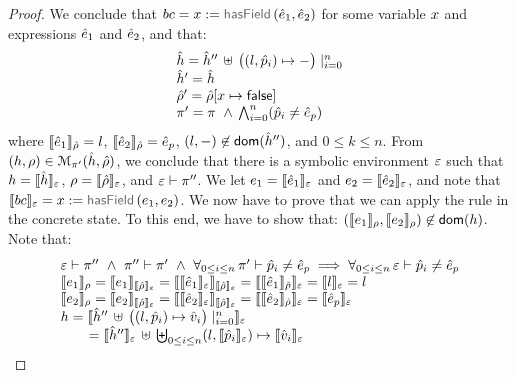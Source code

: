 \begin{proof}
\noindent{}
We conclude that  $\bcmd = \jvar := \hasfield(\sexpr_1, \sexpr_2)$ for some variable $\jvar$ and expressions $\sexpr_1$ and $\sexpr_2$, and that: 
$$
\begin{array}{l}
  \sheap =  \sheap'' \, \uplus \, \big((l, \sexprp_i) \mapsto -\big)\mid_{i = 0}^n      \\
  \sheap' =  \sheap \\
  \sstore' = \sstore[\jvar \mapsto \jfalse] \\ 
     \pc' = \pc \ \wedge \,  \bigwedge_{i = 0}^n (\sexprp_i \neq \sexpr_p) 
\end{array}
$$ 
where $\symbeval{\sexpr_1}{\sstore} =  \loc$, $\symbeval{\sexpr_2}{\sstore} =  \sexpr_p$, 
$(\loc, -) \not\in \domain(\sheap'')$, and $0 \leq k \leq n$. 
%
From $(\heap, \store) \in \smodels{\sheap, \sstore}{\pc'}$, we conclude that there is a symbolic environment
$\senv$ such that $\heap = \semexpr{\sheap}{\senv}$, $\store = \semexpr{\sstore}{\senv}$, and 
$\senv \vdash \pc''$. 
We let $\jsilexpr_1 = \symbeval{\sexpr_1}{\senv}$ and  
$\jsilexpr_2 = \symbeval{\sexpr_2}{\senv}$, and note that $\symbeval{\bcmd}{\senv} = \jvar := \hasfield(\jsilexpr_1, \jsilexpr_2)$.
We now have to prove that we can apply the  rule in the concrete state.
To this end, we have to show that: $(\symbeval{\jsilexpr_1}{\store}, \symbeval{\jsilexpr_2}{\store}) \not\in \domain(\heap)$. 
Note that: 
$$
\begin{array}{l}
%
\senv \vdash \pc'' \ \wedge \ \pc'' \vdash \pc' \ \wedge \ \forall_{0 \leq i \leq n}  \, \pc' \vdash \sexprp_i \neq \sexpr_p  
      \implies \forall_{0 \leq i \leq n}  \, \senv \vdash \sexprp_i \neq \sexpr_p  \\
%
 \symbeval{\jsilexpr_1}{\store} = \symbeval{\jsilexpr_1}{\symbeval{\sstore}{\senv}} = \symbeval{\symbeval{\sexpr_1}{\senv}}{\symbeval{\sstore}{\senv}} = \symbeval{\symbeval{\sexpr_1}{\sstore}}{\senv} 
    = \symbeval{\loc}{\senv} = \loc \\ 
  \symbeval{\jsilexpr_2}{\store}  = \symbeval{\jsilexpr_2}{\semexpr{\sstore}{\senv}} =  \symbeval{\symbeval{\sexpr_2}{\senv}}{\symbeval{\sstore}{\senv}} = \symbeval{\symbeval{\sexpr_2}{\sstore}}{\senv}
   =  \symbeval{\sexpr_p}{\senv} \\
 \heap = \semexpr{\sheap'' \, \uplus \, \big((l, \sexprp_i) \mapsto \sexprv_i\big)\mid_{i = 0}^n}{\senv} \\
    \qquad = \semexpr{\sheap''}{\senv} \dunion \biguplus_{0 \leq i \leq n} (l, \semexpr{\sexprp_i}{\senv}) \mapsto \semexpr{\sexprv_i}{\senv}

\end{array}$$
\end{proof}
